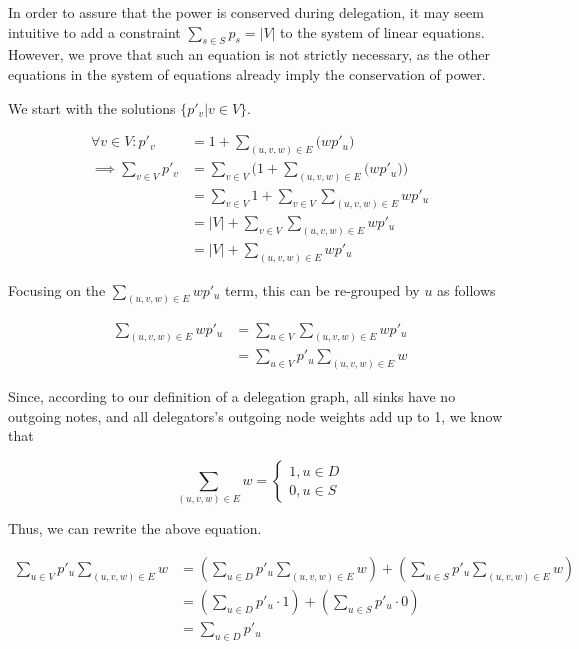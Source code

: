  In order to assure that the power is conserved during delegation, it may seem intuitive to add a constraint $\sum_{s \in S} p_s = |V|$ to the system of linear equations. However, we prove that such an equation is not strictly necessary, as the other equations in the system of equations already imply the conservation of power.

We start with the solutions $\{p'_v | v \in V\}$.

\begin{align*}
\forall v \in V: p'_v &= 1+\sum_{(u, v, w) \in E} \bigl(wp'_u \bigr) \\
\implies \sum_{v \in V} p'_v &= \sum_{v \in V} \bigl( 1 + \sum_{(u, v, w) \in E} \bigl( wp'_u \bigr ) \bigr) \\
&= \sum_{v \in V} 1 + \sum_{v \in V} \sum_{(u, v, w) \in E} wp'_u \\
&= |V| + \sum_{v \in V} \sum_{(u, v, w) \in E} wp'_u \\
&= |V| + \sum_{(u, v, w) \in E} wp'_u
\end{align*}

Focusing on the $\sum_{(u, v, w) \in E} wp'_u$ term, this can be re-grouped by $u$ as follows 

\begin{align*}
\sum_{(u, v, w) \in E} wp'_u &= \sum_{u \in V} \sum_{(u, v, w) \in E} wp'_u \\
&= \sum_{u \in V} p'_u  \sum_{(u, v, w) \in E} w
\end{align*}

Since, according to our definition of a delegation graph, all sinks have no outgoing notes, and all delegators's outgoing node weights add up to 1, we know that

\[
\sum_{(u, v, w) \in E} w = \begin{cases} 1, u \in D \\ 0, u \in S \end{cases}
\]

Thus, we can rewrite the above equation.

\begin{align*}
\sum_{u \in V} p'_u  \sum_{(u, v, w) \in E} w &= \left(\sum_{u \in D} p'_u  \sum_{(u, v, w) \in E} w \right) + \left( \sum_{u \in S} p'_u  \sum_{(u, v, w) \in E} w \right) \\
&= \left( \sum_{u \in D} p'_u \cdot 1 \right) + \left(\sum_{u \in S} p'_u \cdot 0 \right) \\
&= \sum_{u \in D} p'_u
\end{align*}

